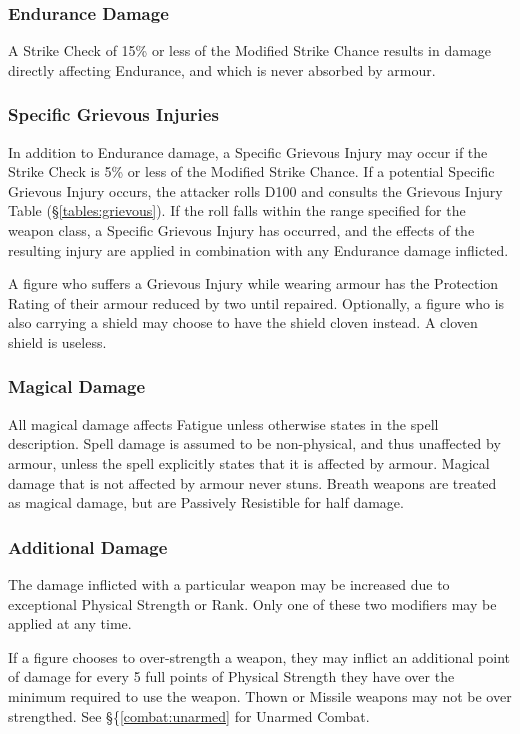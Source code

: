 \begin{multicols*}{3}
\subsubsection{Endurance Damage}

A Strike Check of 15\% or less of the Modified Strike Chance results in
damage directly affecting Endurance, and which is never absorbed by
armour.

\subsubsection{Specific Grievous Injuries}

In addition to Endurance damage, a Specific Grievous Injury may occur
if the Strike Check is 5\% or less of the Modified Strike Chance. If a
potential Specific Grievous Injury occurs, the attacker rolls D100 and
consults the Grievous Injury Table (\S \ref{tables:grievous}). If the
roll falls within the range specified for the weapon class, a Specific
Grievous Injury has occurred, and the effects of the resulting injury
are applied in combination with any Endurance damage inflicted.

A figure who suffers a Grievous Injury while wearing armour has the
Protection Rating of their armour reduced by two until
repaired. Optionally, a figure who is also carrying a shield may
choose to have the shield cloven instead. A cloven shield is useless.

\subsubsection{Magical Damage}

All magical damage affects Fatigue unless otherwise states in the
spell description. Spell damage is assumed to be non-physical, and
thus unaffected by armour, unless the spell explicitly states that it
is affected by armour. Magical damage that is not affected by armour
never stuns. Breath weapons are treated as magical damage, but are
Passively Resistible for half damage.

\subsubsection{Additional Damage}

The damage inflicted with a particular weapon may be increased due to
exceptional Physical Strength or Rank. Only one of these two modifiers
may be applied at any time.

If a figure chooses to over-strength a weapon, they may inflict an
additional point of damage for every 5 full points of Physical
Strength they have over the minimum required to use the weapon.  Thown
or Missile weapons may not be over strengthed.  See
\S\{\ref{combat:unarmed} for Unarmed Combat.


\end{multicols*}
